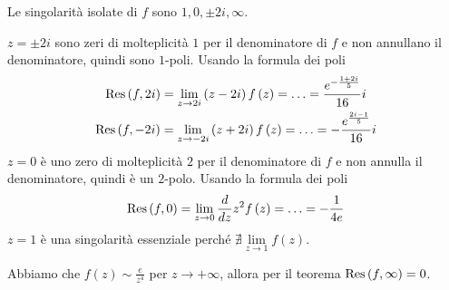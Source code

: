 Le singolarità isolate di $f$ sono $1,0,\pm 2i,\infty $.

$z=\pm 2i$ sono zeri di molteplicità $1$ per il denominatore di $f$ e non annullano il denominatore, quindi sono $1$-poli. Usando la formula dei poli
\begin{gather*}
\operatorname{Res} \left( f,2i\right) =\lim\limits _{z\rightarrow 2i}\left( z-2i\right) f\left( z\right) =\dotsc =\frac{e^{-\frac{1+2i}{5}}}{16} i\\
\operatorname{Res} \left( f,-2i\right) =\lim\limits _{z\rightarrow -2i}\left( z+2i\right) f\left( z\right) =\dotsc =-\frac{e^{\frac{2i-1}{5}}}{16} i
\end{gather*}
$z=0$ è uno zero di molteplicità $2$ per il denominatore di $f$ e non annulla il denominatore, quindi è un $2$-polo. Usando la formula dei poli
\begin{equation*}
\operatorname{Res} \left( f,0\right) =\lim\limits _{z\rightarrow 0}\frac{d}{dz} z^{2} f\left( z\right) =\dotsc =-\frac{1}{4e}
\end{equation*}
$z=1$ è una singolarità essenziale perché $\nexists \lim\limits _{z\rightarrow 1} f\left( z\right)$.

Abbiamo che $f\left( z\right) \sim \frac{e}{z^{4}}$ per $z\rightarrow +\infty $, allora per il teorema $\operatorname{Res} \left( f,\infty \right) =0$.

